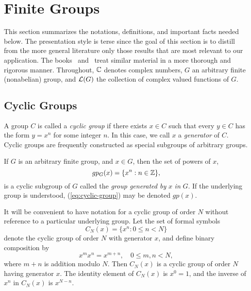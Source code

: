 \section{Finite Groups}
\label{sec:hafg}
%
This section summarizes the notations,
definitions, and important facts needed below.
The presentation style is terse since the goal of this
section is to distill from the more general literature only
those results that are most relevant to our application.
The books~\cite{An:2003} and~\cite{Tolimieri:1998} treat similar
material in a more thorough and rigorous manner.
Throughout, $\mathbb{C}$ denotes complex numbers, 
$G$ an arbitrary finite (nonabelian) group, %
and $\mathcal{L}(G)$ the collection of complex valued functions of $G$.

\subsection{Cyclic Groups}
A group $C$ is called a \emph{cyclic group} if there exists
$x\in C$ such that every $y\in C$ has the form $y=x^n$ for
some integer $n$.  In this case, we call $x$ a
\emph{generator} of $C$. 
Cyclic groups are frequently constructed as special
subgroups of arbitrary groups.  

If $G$ is an arbitrary finite group, 
and $x\in G$, then the set of powers of $x$,
\begin{equation}
  \label{eq:cyclic-group}
gp_G(x) = \{x^n : n\in \mathbb{Z}\},
\end{equation}
is a cyclic subgroup of $G$ called the 
\emph{group generated by} $x$ \emph{in} $G$.
If the underlying group is understood,
(\ref{eq:cyclic-group}) may be denoted $gp(x)$.

It will be convenient to have notation for a cyclic group of
order $N$ without reference to a particular underlying group.
Let the set of formal symbols
\begin{equation}\label{eq:cyclicGroup}
C_N(x) = \{ x^n : 0 \leq n < N\}
\end{equation} 
denote the cyclic group of order $N$ with
generator $x$, and define binary composition by
\begin{equation}\label{eq:binarycomp}
x^m x^n = x^{m+n}, \quad 0\leq m, n < N,
\end{equation}
where $m+n$ is addition modulo $N$.  Then $C_N(x)$ is a
cyclic group of order $N$ having generator $x$. The identity
element of $C_N(x)$ is $x^0 = 1$, and the inverse of $x^n$
in $C_N(x)$ is $x^{N-n}$.

